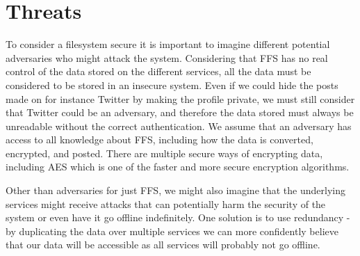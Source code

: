 \section{Threats}
To consider a filesystem secure it is important to imagine different potential adversaries who might attack the system. Considering that FFS has no real control of the data stored on the different services, all the data must be considered to be stored in an insecure system. Even if we could hide the posts made on for instance Twitter by making the profile private, we must still consider that Twitter could be an adversary, and therefore the data stored must always be unreadable without the correct authentication. We assume that an adversary has access to all knowledge about FFS, including how the data is converted, encrypted, and posted. There are multiple secure ways of encrypting data, including AES which is one of the faster and more secure encryption algorithms\cite{mahajanStudyEncryptionAlgorithms2013}.

Other than adversaries for just FFS, we might also imagine that the underlying services might receive attacks that can potentially harm the security of the system or even have it go offline indefinitely. One solution is to use redundancy - by duplicating the data over multiple services we can more confidently believe that our data will be accessible as all services will probably not go offline. 